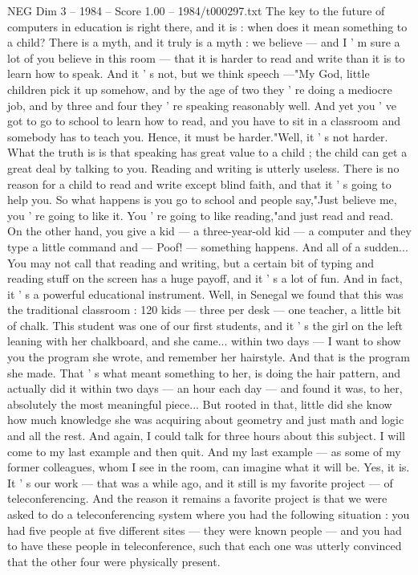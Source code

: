 \begin{textsample}{NEG Dim 3 – 1984 – Score 1.00 – 1984/t000297.txt}
The key to the future of computers in education is right there, and it is : when does it mean something to a child?
There is a myth, and it truly is a myth : we believe — and I ' m sure a lot of you believe in this room — that it is harder to read and write than it is to learn how to speak.
And it ' s not, but we think speech —"My God, little children pick it up somehow, and by the age of two they ' re doing a mediocre job, and by three and four they ' re speaking reasonably well.
And yet you ' ve got to go to school to learn how to read, and you have to sit in a classroom and somebody has to teach you.
Hence, it must be harder."Well, it ' s not harder.
What the truth is is that speaking has great value to a child ; the child can get a great deal by talking to you.
Reading and writing is utterly useless.
There is no reason for a child to read and write except blind faith, and that it ' s going to help you.
So what happens is you go to school and people say,"Just believe me, you ' re going to like it.
You ' re going to like reading,"and just read and read.
On the other hand, you give a kid — a three-year-old kid — a computer and they type a little command and — Poof! — something happens.
And all of a sudden...
You may not call that reading and writing, but a certain bit of typing and reading stuff on the screen has a huge payoff, and it ' s a lot of fun.
And in fact, it ' s a powerful educational instrument.
Well, in Senegal we found that this was the traditional classroom : 120 kids — three per desk — one teacher, a little bit of chalk.
This student was one of our first students, and it ' s the girl on the left leaning with her chalkboard, and she came... within two days — I want to show you the program she wrote, and remember her hairstyle.
And that is the program she made.
That ' s what meant something to her, is doing the hair pattern, and actually did it within two days — an hour each day — and found it was, to her, absolutely the most meaningful piece...
But rooted in that, little did she know how much knowledge she was acquiring about geometry and just math and logic and all the rest.
And again, I could talk for three hours about this subject.
I will come to my last example and then quit.
And my last example — as some of my former colleagues, whom I see in the room, can imagine what it will be.
Yes, it is.
It ' s our work — that was a while ago, and it still is my favorite project — of teleconferencing.
And the reason it remains a favorite project is that we were asked to do a teleconferencing system where you had the following situation : you had five people at five different sites — they were known people — and you had to have these people in teleconference, such that each one was utterly convinced that the other four were physically present.

\end{textsample}
